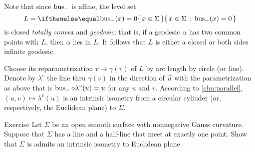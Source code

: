 Note that since $\mathop{\rm bus}\nolimits_-$ is affine, the level set 
\[L=\set{x\in\Sigma}{\bus_-(x)=0}\]
is closed \emph{totally convex} and \emph{geodesic};
that is, if a geodesic $\alpha$ has two common points with $L$, then $\alpha$ lies in $L$.
It follows that $L$ is either a closed or both sides infinite geodesic.

Choose its reparametrization $v\mapsto\gamma(v)$ of $L$ by arc length by circle (or line).
Denote by $\lambda^v$ the line thru $\gamma(v)$ in the direction of $\vec u$ with the parametrization as above that is $\mathop{\rm bus}\nolimits_-\circ\lambda^v(u)=u$ for any $u$ and $v$.
According to \ref{clm:parallel}, $(u,v)\mapsto \lambda^v(u)$ is an intrinsic isometry from a circular cylinder (or, respectively, the Euclidean plane) to $\Sigma$.
\qeds

\begin{thm}{Exercise}\label{ex:line+half-line}
Let $\Sigma$ be an open smooth surface with nonnegative Gauss curvature.
Suppose that $\Sigma$ has a line and a half-line that meet at exactly one point.
Show that $\Sigma$ is admits an intrinsic isometry to Euclidean plane.
\end{thm}

